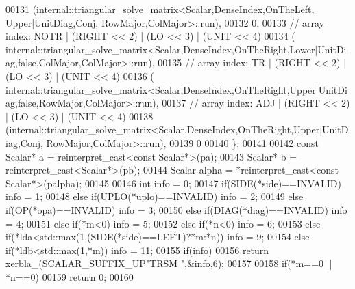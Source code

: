 \begin{DoxyCode}
00131     (internal::triangular\_solve\_matrix<Scalar,DenseIndex,OnTheLeft, Upper|UnitDiag,Conj,
       RowMajor,ColMajor>::run),
00132     0,
00133     \textcolor{comment}{// array index: NOTR  | (RIGHT << 2) | (LO << 3) | (UNIT  << 4)}
00134     (
      internal::triangular\_solve\_matrix<Scalar,DenseIndex,OnTheRight,Lower|UnitDiag,false,ColMajor,ColMajor>::run),
00135     \textcolor{comment}{// array index: TR    | (RIGHT << 2) | (LO << 3) | (UNIT  << 4)}
00136     (
      internal::triangular\_solve\_matrix<Scalar,DenseIndex,OnTheRight,Upper|UnitDiag,false,RowMajor,ColMajor>::run),
00137     \textcolor{comment}{// array index: ADJ   | (RIGHT << 2) | (LO << 3) | (UNIT  << 4)}
00138     (internal::triangular\_solve\_matrix<Scalar,DenseIndex,OnTheRight,Upper|UnitDiag,Conj,
       RowMajor,ColMajor>::run),
00139     0
00140   \};
00141 
00142   \textcolor{keyword}{const} Scalar* a = \textcolor{keyword}{reinterpret\_cast<}\textcolor{keyword}{const }Scalar*\textcolor{keyword}{>}(pa);
00143   Scalar* b = \textcolor{keyword}{reinterpret\_cast<}Scalar*\textcolor{keyword}{>}(pb);
00144   Scalar  alpha = *\textcolor{keyword}{reinterpret\_cast<}\textcolor{keyword}{const }Scalar*\textcolor{keyword}{>}(palpha);
00145 
00146   \textcolor{keywordtype}{int} info = 0;
00147   \textcolor{keywordflow}{if}(SIDE(*side)==INVALID)                                            info = 1;
00148   \textcolor{keywordflow}{else} \textcolor{keywordflow}{if}(UPLO(*uplo)==INVALID)                                       info = 2;
00149   \textcolor{keywordflow}{else} \textcolor{keywordflow}{if}(OP(*opa)==INVALID)                                          info = 3;
00150   \textcolor{keywordflow}{else} \textcolor{keywordflow}{if}(DIAG(*diag)==INVALID)                                       info = 4;
00151   \textcolor{keywordflow}{else} \textcolor{keywordflow}{if}(*m<0)                                                       info = 5;
00152   \textcolor{keywordflow}{else} \textcolor{keywordflow}{if}(*n<0)                                                       info = 6;
00153   \textcolor{keywordflow}{else} \textcolor{keywordflow}{if}(*lda<std::max(1,(SIDE(*side)==LEFT)?*m:*n))                 info = 9;
00154   \textcolor{keywordflow}{else} \textcolor{keywordflow}{if}(*ldb<std::max(1,*m))                                        info = 11;
00155   \textcolor{keywordflow}{if}(info)
00156     \textcolor{keywordflow}{return} xerbla\_(SCALAR\_SUFFIX\_UP\textcolor{stringliteral}{"TRSM "},&info,6);
00157 
00158   \textcolor{keywordflow}{if}(*m==0 || *n==0)
00159     \textcolor{keywordflow}{return} 0;
00160 

\end{DoxyCode}
